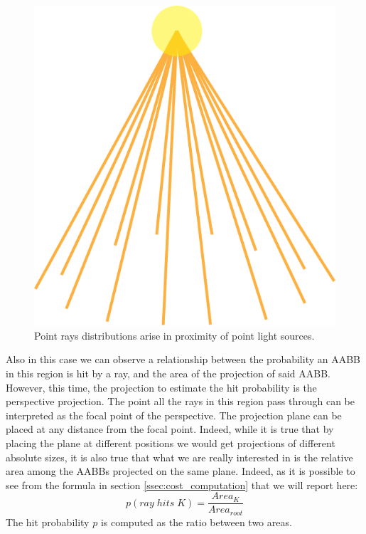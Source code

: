 \documentclass{PoliMi_MasterThesis}
\begin{document}
\begin{figure}[H]
    \centering
    \includegraphics[width=\textwidth*\real{0.3}]{Images/point_light_rays.png}
    \caption{Point rays distributions arise in proximity of point light sources.}
    \label{fig:point_rays_distribution}
\end{figure}

Also in this case we can observe a relationship between the probability an AABB in this region is hit by a ray, and the area of the projection of said AABB. However, this time, the projection to estimate the hit probability is the perspective projection. The point all the rays in this region pass through can be interpreted as the focal point of the perspective. The projection plane can be placed at any distance from the focal point. Indeed, while it is true that by placing the plane at different positions we would get projections of different absolute sizes, it is also true that what we are really interested in is the relative area among the AABBs projected on the same plane. Indeed, as it is possible to see from the formula in section \ref{ssec:cost_computation} that we will report here:
$$p(ray\; hits\; K) = \frac{Area_K}{Area_{root}}$$
The hit probability $p$ is computed as the ratio between two areas.
\end{document}
